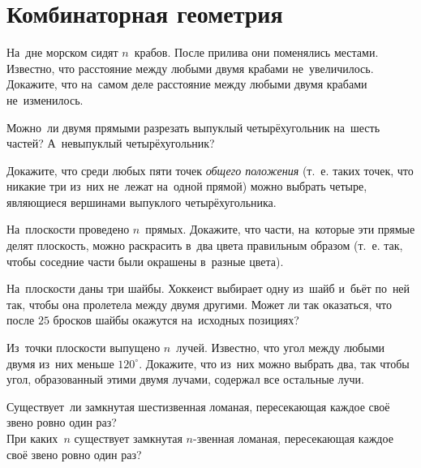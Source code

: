

\section*{Комбинаторная геометрия}


\begin{problems}

\item
На~дне морском сидят $n$~крабов.
После прилива они поменялись местами.
Известно, что расстояние между любыми двумя крабами не~увеличилось.
Докажите, что на~самом деле расстояние между любыми двумя крабами не~изменилось.

\item
Можно~ли двумя прямыми разрезать выпуклый четырёхугольник на~шесть частей?
А~невыпуклый четырёхугольник?

\item
Докажите, что среди любых пяти точек \emph{общего положения}
(т.~е. таких точек, что никакие три из~них не~лежат на~одной прямой) можно выбрать
четыре, являющиеся вершинами выпуклого четырёхугольника.

\item
На~плоскости проведено $n$~прямых.
Докажите, что части, на~которые эти прямые делят плоскость, можно раскрасить в~два
цвета правильным образом
(т.~е. так, чтобы соседние части были окрашены в~разные цвета).

\item
На~плоскости даны три шайбы.
Хоккеист выбирает одну из~шайб и~бьёт по~ней так, чтобы она пролетела между двумя
другими.
Может ли так оказаться, что после $25$ бросков шайбы окажутся на~исходных позициях?

\item
Из~точки плоскости выпущено $n$~лучей.
Известно, что угол между любыми двумя из~них меньше $120^{\circ}$.
Докажите, что из~них можно выбрать два, так чтобы угол, образованный этими двумя
лучами, содержал все остальные лучи.

\item
\sbp
Существует~ли замкнутая шестизвенная ломаная, пересекающая каждое своё звено ровно один
раз?
\\
\sbp
При каких~$n$ существует замкнутая $n$-звенная ломаная, пересекающая каждое своё звено
ровно один раз?


\end{problems}
